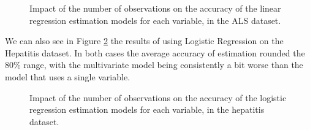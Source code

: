 \begin{figure}[h]
	\begin{subfigmatrix}{2}
  \end{subfigmatrix}
  \caption{Impact of the number of observations on the accuracy of the linear regression estimation models for each variable, in the ALS dataset.}
  \label{fig:estimationals}
\end{figure}

We can also see in Figure \ref{fig:estimationlogh} the results of using Logistic Regression on the
 Hepatitis dataset. In both cases the average accuracy of estimation rounded the 80\% range, with the multivariate model being consistently
 a bit worse than the model that uses a single variable.
 
 \begin{figure}[h]
	\begin{subfigmatrix}{2}
  \end{subfigmatrix}
  \caption{Impact of the number of observations on the accuracy of the logistic regression estimation models for each variable, in the hepatitis dataset.}
  \label{fig:estimationlogh}
\end{figure}


